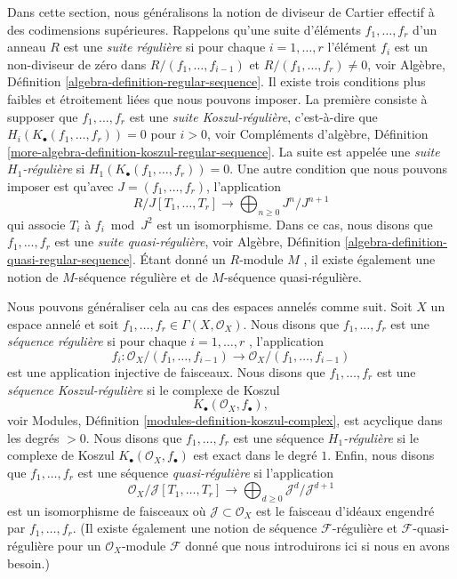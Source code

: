 \noindent
Dans cette section, nous généralisons la notion de diviseur de Cartier effectif à
des codimensions supérieures. Rappelons qu'une suite d'éléments  $f_1, \ldots, f_r$  d'un
anneau  $R$  est une  {\it  suite régulière} 
si pour chaque  $i = 1, \ldots, r$  l'élément  $f_i$  est un non-diviseur de zéro dans
 $R/(f_1, \ldots, f_{i - 1})$  et  $R/(f_1, \ldots, f_r) \not = 0$, voir Algèbre, Définition  \ref{algebra-definition-regular-sequence}. Il existe
trois conditions plus faibles et étroitement liées que nous pouvons imposer. La
première consiste à supposer que  $f_1, \ldots, f_r$  est une  {\it 
suite Koszul-régulière}, c’est-à-dire que  $H_i(K_\bullet(f_1, \ldots, f_r)) = 0$  pour
 $i > 0$, voir Compléments d'algèbre, Définition  \ref{more-algebra-definition-koszul-regular-sequence}. La suite est
appelée une  {\it  suite  $H_1$-régulière}  si
 $H_1(K_\bullet(f_1, \ldots, f_r)) = 0$. Une autre condition que nous pouvons imposer est qu'avec
 $J = (f_1, \ldots, f_r)$, l'application
$$
R/J[T_1, \ldots, T_r]
\longrightarrow
\bigoplus\nolimits_{n \geq 0}
J^n/J^{n + 1}
$$
qui associe  $T_i$  à  $f_i \bmod J^2$  est un isomorphisme. Dans ce cas, nous
disons que  $f_1, \ldots, f_r$  est une  {\it  suite
quasi-régulière}, voir Algèbre, Définition  \ref{algebra-definition-quasi-regular-sequence}. Étant donné un
 $R$-module  $M$ , il existe également une notion de
 $M$-séquence régulière et de  $M$-séquence quasi-régulière.

\medskip\noindent
Nous pouvons généraliser cela au cas des espaces annelés comme suit. Soit
 $X$  un espace annelé et soit  $f_1, \ldots, f_r \in \Gamma(X, \mathcal{O}_X)$. Nous disons que  $f_1, \ldots, f_r$ 
est une  {\it  séquence régulière}  si pour chaque
 $i = 1, \ldots, r$ , l'application
\begin{equation}
\label{equation-map-regular}
f_i :
\mathcal{O}_X/(f_1, \ldots, f_{i - 1})
\longrightarrow
\mathcal{O}_X/(f_1, \ldots, f_{i - 1})
\end{equation}
est une application injective de faisceaux. Nous disons que  $f_1, \ldots, f_r$  est une
 {\it  séquence Koszul-régulière}  si le complexe de
Koszul
\begin{equation}
\label{equation-koszul}
K_\bullet(\mathcal{O}_X, f_\bullet),
\end{equation}
voir Modules, Définition  \ref{modules-definition-koszul-complex}, est acyclique dans les degrés  $> 0$.
Nous disons que  $f_1, \ldots, f_r$  est une séquence  {\it 
 $H_1$-régulière}  si le complexe de Koszul  $K_\bullet(\mathcal{O}_X, f_\bullet)$  est exact
dans le degré  $1$. Enfin, nous disons que  $f_1, \ldots, f_r$  est une séquence
 {\it  quasi-régulière}  si l'application
\begin{equation}
\label{equation-map-quasi-regular}
\mathcal{O}_X/\mathcal{J}[T_1, \ldots, T_r]
\longrightarrow
\bigoplus\nolimits_{d \geq 0} \mathcal{J}^d/\mathcal{J}^{d + 1}
\end{equation}
est un isomorphisme de faisceaux où  $\mathcal{J} \subset \mathcal{O}_X$  est le faisceau d'idéaux engendré
par  $f_1, \ldots, f_r$. (Il existe également une notion de séquence
 $\mathcal{F}$-régulière et  $\mathcal{F}$-quasi-régulière pour un  $\mathcal{O}_X$-module
 $\mathcal{F}$  donné que nous introduirons ici si nous en avons besoin.)

